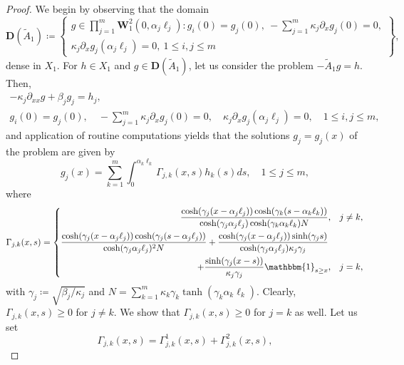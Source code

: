 \documentclass[a4paper,11pt,reqno]{amsart}
\def\1{\mathbbm{1}}
\def\ka{\kappa}
\theoremstyle{plain}
\numberwithin{equation}{section}
\begin{document}
\begin{proof}
We begin by observing that the domain
\begin{equation*}
{\bm D}(\tilde{A}_1)\coloneqq\left\{\begin{gathered}g\in \prod_{j=1}^m \bm{W}_1^2(0,\alpha_j\ell_j):g_i(0)=g_j(0),~-\sum_{j=1}^{m}\ka_j\partial_{x}g_j(0)=0,\\ \ka_j\partial_{x}g_j(\alpha_j\ell_j)=0,~ 1 \le i,j\le m\end{gathered}\right\},
\end{equation*}
dense in $X_1$. For $h\in X_1$ and $g\in \bm{D}(\tilde{A}_1)$, let us consider the problem $-\tilde{A}_1g=h$. Then,
\begin{equation*}
\begin{gathered}
-\ka_j\partial_{xx}g+\beta_j g_j=h_j,\\ g_i(0)=g_j(0),\quad-\sum_{j=1}^{m}\ka_j\partial_{x}g_j(0)=0,\quad \ka_j\partial_{x}g_j(\alpha_j\ell_j)=0,\quad 1 \le i,j\le m,
\end{gathered}
\end{equation*}
and application of routine computations yields that the solutions $g_j=g_j(x)$ of the problem are given by
\begin{equation*}
g_j(x) = \sum_{k=1}^m \int_0^{\alpha_k \ell_k} \Gamma_{j,k}(x,s) h_k(s) ds, \quad 1 \le j\le m,
\end{equation*}
where 
\begin{equation*}
\Gamma_{j,k}(x,s) = \left\{
\begin{split}
\frac{ \cosh(\gamma_j (x-\alpha_j \ell_j)) \cosh(\gamma_k (s-\alpha_k \ell_k)) }{ \cosh(\gamma_j \alpha_j \ell_j) \cosh(\gamma_k \alpha_k \ell_k)N } &, && j \neq k,\\
\frac{\cosh(\gamma_j (x-\alpha_j \ell_j)) \cosh(\gamma_j (s-\alpha_j \ell_j)) }{ \cosh(\gamma_j \alpha_j \ell_j)^2 N} +\frac{ \cosh(\gamma_j (x-\alpha_j \ell_j)) \sinh(\gamma_j s) }{ \cosh(\gamma_j \alpha_j \ell_j) \kappa_j \gamma_j }\\+\frac{ \sinh(\gamma_j (x-s)) }{ \kappa_j \gamma_j } \1_{s \geq x}&, && j = k,
\end{split}\right.
\end{equation*}
with $\gamma_j \coloneqq \sqrt{{\beta_j}/{\kappa_j}}$ and $N = \sum_{k=1}^m \kappa_k \gamma_k \tanh(\gamma_k \alpha_k \ell_k)$. 
Clearly, $\Gamma_{j,k}(x,s)\ge 0$ for $j \neq k$. We show that $\Gamma_{j,k}(x,s)\ge 0$ for $j =k$ as well. Let us set
\begin{equation*}
\Gamma_{j,k}(x,s) = \Gamma^1_{j,k}(x,s) + \Gamma^2_{j,k}(x,s),

\end{equation*}
\end{proof}
\end{document}
